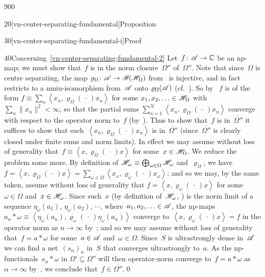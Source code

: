 \begin{parsec}{900}
\begin{point}{20}[vn-center-separating-fundamental]{Proposition}
\begin{point}{30}[vn-center-separating-fundamental-i]{Proof}
\begin{point}{40}{Concerning~\ref{vn-center-separating-fundamental-2}}%
Let~$f\colon \mathscr{A}\to\mathbb{C}$ be an np-map;
we must show that~$f$ is in 
the norm closure~$\overline{\Omega''}$ of~$\Omega''$.
Note that since~$\Omega$ is centre separating,
the map $\varrho_\Omega\colon \mathscr{A}\to\mathscr{B}(\mathscr{H}_\Omega)$
from~
is injective,
and in fact restricts
to a nmiu-isomorphism
from~$\mathscr{A}$ onto $\varrho_\Omega(\mathscr{A})$
(cf.~).
So by~
$f$ is of the form $f\equiv 
\sum_n \left<x_n,\varrho_\Omega(\,\cdot\,)x_n\right>$
for some $x_1,x_2,\dotsc \in\mathscr{H}_\Omega$
with $\sum_n \|x_n\|^2<\infty$,
so that the partial sums
$\sum_{n=1}^N \left<x_n,\varrho_\Omega(\,\cdot\,)x_n\right>$
converge with respect to the operator norm to~$f$
(by~).
Thus to show that~$f$ is in~$\overline{\Omega''}$
it suffices to show that each~$\left<x_n,\varrho_\Omega(\,\cdot\,)x_n\right>$
is in~$\overline{\Omega''}$
(since~$\overline{\Omega''}$ is clearly closed
under finite sums and norm limits).
In effect
we may assume 
without loss of generality
that~$f\equiv \left<x,\varrho_\Omega(\,\cdot\,)x\right>$
for some~$x\in \mathscr{H}_\Omega$.
We reduce the problem some more.
By definition 
of $\mathscr{H}_\omega\equiv \bigoplus_{\omega\in\Omega}\mathscr{H}_\omega$
and~$\varrho_\Omega$,
we have $f=\left<x,\varrho_\Omega(\,\cdot\,)x\right>
= \sum_{\omega\in \Omega} 
\left<x_\omega,\varrho_\omega(\,\cdot\,)x_\omega\right>$;
and so we may, by the same token, assume without loss of generality
that $f=\left<x,\varrho_\omega(\,\cdot\,)x\right>$
for some~$\omega\in \Omega$
and~$x\in \mathscr{H}_\omega$.
Since such~$x$ (by definition of~$\mathscr{H}_\omega$, 
)
is the norm limit of
a sequence $\eta_\omega(a_1),\,\eta_\omega(a_2),\,
\dotsb$,
where~$a_1,a_2,\dotsc\in\mathscr{A}$,
the np-maps $a_n\ast \omega\equiv 
\left<\eta_\omega(a_n),\varrho_\omega(\,\cdot\,)\eta_\omega(a_n)\right>$
converge to~$\left<x,\varrho_\omega(\,\cdot\,) x\right>=f$
in the operator norm as $n\to\infty$ by~;
and so we may assume without loss of generality
that~$f=a\ast \omega$ for some~$a\in\mathscr{A}$ and~$\omega\in \Omega$.
Since~$S$ is ultrastrongly dense in~$\mathscr{A}$
we can find a net~$(s_\alpha)_\alpha$
in~$S$ that converges ultrastrongly to~$a$.
As the np-functionals~$s_\alpha \ast \omega$
in $\Omega'\subseteq \Omega''$
will then
operator-norm converge
to~$f= a\ast \omega$
as $\alpha\to\infty$
by~,
we conclude that~$f\in \overline{\Omega''}$.\qed
\end{point}
\end{point}
\end{point}
\end{parsec}
